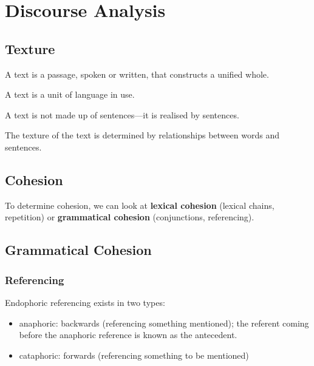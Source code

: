 \documentclass[../main.tex]{subfiles}
\begin{document}
\section{Discourse Analysis}

    \subsection{Texture}
    A text is a passage, spoken or written, that constructs a unified whole. 
    
    A text is a unit of language in use.
    
    A text is not made up of sentences---it is realised by sentences.
    
    
    The texture of the text is determined by relationships between words and sentences.

    \subsection{Cohesion}

    To determine cohesion, we can look at \textbf{lexical cohesion} (lexical chains, repetition) or \textbf{grammatical cohesion} (conjunctions, referencing).

    \subsection{Grammatical Cohesion}
        \subsubsection{Referencing}
        Endophoric referencing exists in two types:\begin{itemize}
            \item anaphoric: backwards (referencing something mentioned); the referent coming before the anaphoric reference is known as the antecedent.
            \item cataphoric: forwards (referencing something to be mentioned)
        \end{itemize}
\end{document}
